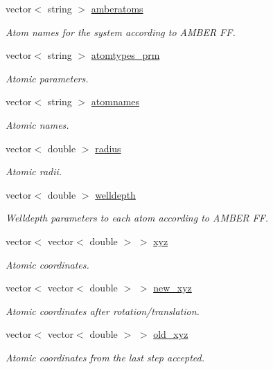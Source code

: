 \begin{DoxyCompactItemize}
vector$<$ string $>$ \hyperlink{classMol2_af85e3cb0ab589edbe1f892600dd00d16}{amberatoms}
\begin{DoxyCompactList}\small\item\em Atom names for the system according to AMBER FF. \end{DoxyCompactList}\item 
vector$<$ string $>$ \hyperlink{classMol2_a6bda0cb634fcad4bc779b68e15e4862a}{atomtypes\_\-prm}
\begin{DoxyCompactList}\small\item\em Atomic parameters. \end{DoxyCompactList}\item 
vector$<$ string $>$ \hyperlink{classMol2_acfc5e49a5d727d7eb189d14af49dc686}{atomnames}
\begin{DoxyCompactList}\small\item\em Atomic names. \end{DoxyCompactList}\item 
vector$<$ double $>$ \hyperlink{classMol2_ae7574bc736a4fcf91d269806af6dac56}{radius}
\begin{DoxyCompactList}\small\item\em Atomic radii. \end{DoxyCompactList}\item 
vector$<$ double $>$ \hyperlink{classMol2_aa6b07421f7462dbbb56fdae22b01dcd3}{welldepth}
\begin{DoxyCompactList}\small\item\em Welldepth parameters to each atom according to AMBER FF. \end{DoxyCompactList}\item 
vector$<$ vector$<$ double $>$ $>$ \hyperlink{classMol2_afb3479b3d5aea0293e981c2f94f20851}{xyz}
\begin{DoxyCompactList}\small\item\em Atomic coordinates. \end{DoxyCompactList}\item 
vector$<$ vector$<$ double $>$ $>$ \hyperlink{classMol2_acc192964e0d203c413a24b5344cdcf20}{new\_\-xyz}
\begin{DoxyCompactList}\small\item\em Atomic coordinates after rotation/translation. \end{DoxyCompactList}\item 
vector$<$ vector$<$ double $>$ $>$ \hyperlink{classMol2_a610095e1130b4083d386ca5d5e279b1f}{old\_\-xyz}
\begin{DoxyCompactList}\small\item\em Atomic coordinates from the last step accepted. \end{DoxyCompactList}\item 

\end{DoxyCompactItemize}
